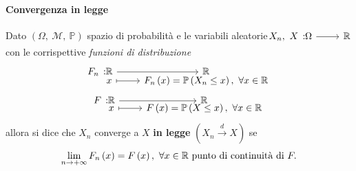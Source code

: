 \paragraph{Convergenza in legge}
\begin{define}
	Dato $\left(\Omega,\ \mathcal{M},\ \mathbb{P}\right)$ spazio di probabilità e le variabili aleatorie $\funz{X_n,\ X}{\Omega}{\realset}$ con le corrispettive \textit{funzioni di distribuzione}
	\begin{gather*}
		\funztot{F_n}{\realset}{\realset}{x}{F_n\left(x\right)=\mathbb{P}\left(X_n\leq x\right),\ \forall x\in \realset}\\
		\funztot{F}{\realset}{\realset}{x}{F\left(x\right)=\mathbb{P}\left(X\leq x\right),\ \forall x\in \realset}
	\end{gather*}
	allora si dice che $X_n$ converge a $X$ \textbf{in legge} $\left(X_n\stackrel{d}{\to}X\right)$ se
	\begin{equation}
		\lim_{n\to+\infty}F_n\left(x\right)=F\left(x\right),\ \forall x\in\realset\ \text{punto di continuità di }F.
	\end{equation}
\end{define}
